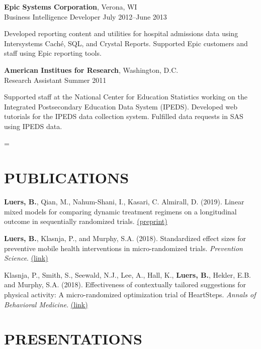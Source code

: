 \documentclass[letterpaper, 11pt]{article}
\newenvironment{absolutelynopagebreak}
  {\par\nobreak\vfil\penalty0\vfilneg
   \vtop\bgroup}
  {\par\xdef\tpd{\the\prevdepth}\egroup
   \prevdepth=\tpd}
\begin{document}
{\bf Epic Systems Corporation}, Verona, WI\\
Business Intelligence Developer \hfill July 2012--June 2013

{\addtolength{\leftskip}{15pt}
 Developed reporting content and utilities for hospital
  admissions data using Intersystems
  Cach\'{e}, SQL, and Crystal Reports.
 Supported Epic customers and
  staff using Epic reporting tools.

}

\begin{absolutelynopagebreak}
{\bf American Institues for Research}, Washington, D.C.\\
Research Assistant \hfill Summer 2011

{\addtolength{\leftskip}{15pt}
    Supported staff at the National Center for Education Statistics
   working on the Integrated Postsecondary Education Data System
   (IPEDS).
 Developed web tutorials for the IPEDS data collection
   system.
 Fulfilled data requests in SAS using IPEDS data.


}

\end{absolutelynopagebreak}

\section{PUBLICATIONS}

\textbf{Luers, B.}, Qian, M., Nahum-Shani, I., Kasari, C. Almirall, D. (2019). Linear mixed models for comparing dynamic treatment regimens on a longitudinal outcome in sequentially randomized trials. \href{https://arxiv.org/abs/1910.10078}{(preprint)}

\textbf{Luers, B.}, Klasnja, P., and Murphy, S.A. (2018). Standardized effect sizes for preventive mobile health interventions in micro-randomized trials. \textit{Prevention Science}. \href{https://doi.org/10.1007/s11121-017-0862-5}{(link)}

Klasnja, P., Smith, S., Seewald, N.J., Lee, A., Hall, K., \textbf{Luers, B.}, Hekler, E.B. and Murphy, S.A. (2018). Effectiveness of contextually tailored suggestions for physical activity: A micro-randomized optimization trial of HeartSteps. \textit{Annals of Behavioral Medicine}. \href{https://doi.org/10.1093/abm/kay067}{(link)}

\section{PRESENTATIONS}
\end{document}
